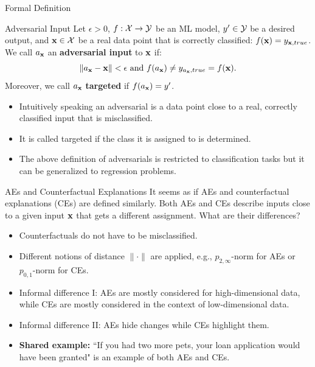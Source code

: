 \documentclass[11pt,compress,t,notes=noshow, xcolor=table]{beamer}
\begin{document}
\begin{vbframe}{Formal Definition}
\begin{block}{Adversarial Input}
Let $\epsilon>0$, $f:\Xspace \rightarrow \Yspace$ be an ML model, $y'\in \Yspace$ be a desired output, and $\xv \in \Xspace$ be a real data point that is correctly classified: $f(\xv)=y_{\xv,true}$. \\ 
 We call $a_{\xv}$ an \textbf{adversarial input} to $\xv$ if:
\begin{equation*}
    \| a_{\xv}- \xv\|<\epsilon\text{ and } f(a_{\xv})\neq y_{a_{\xv},true}=f(\xv).
\end{equation*}
Moreover, we call $a_{\xv}$ \textbf{targeted} if $f(a_{\xv})=y'$.
\end{block}
\begin{itemize}
    \item Intuitively speaking an adversarial is a data point close to a real, correctly classified input that is misclassified.
    \item It is called targeted if the class it is assigned to is determined.
    \item The above definition of adversarials is restricted to classification tasks but it can be generalized to regression problems.
\end{itemize}
\end{vbframe}


\begin{vbframe}{AEs and Counterfactual Explanations}
It seems as if AEs and counterfactual explanations (CEs) are defined similarly. Both AEs and CEs describe inputs close to a given input $\xv$ that gets a different assignment. What are their differences?
\begin{itemize}
    \item Counterfactuals do not have to be misclassified.
    \item Different notions of distance $\|\cdot\|$ are applied, e.g., $p_{2,\infty}$-norm for AEs or $p_{0,1}$-norm for CEs.
    \item Informal difference I: AEs are mostly considered for high-dimensional data, while CEs are mostly considered in the context of low-dimensional data.
    \item Informal difference II: AEs hide changes while CEs highlight them.
    \item \textbf{Shared example:} ``If you had two more pets, your loan application would have been granted" is an example of both AEs and CEs.
\end{itemize}
\end{vbframe}
\end{document}
